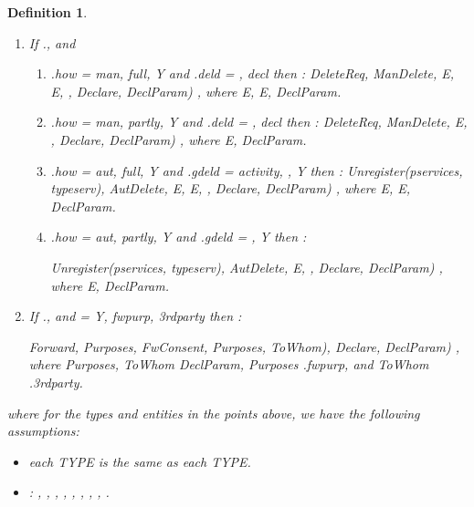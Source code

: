 \documentclass[a4paper]{article}
\newtheorem{ttd}{Definition}
\begin{document}
\begin{ttd}
\begin{enumerate}
\begin{enumerate}
\item .\textit{storerev} = t1, t2 , \textit{places}, Y then , ,   \textit{PartOf}(), OWNER() =  and \textit{Storerev}(, , \textit{TT}), \textit{Declare}, \textit{DeclParam})  , where   \textit{DeclParam}, and  = \textit{places} and t1  \textit{TT}  t2.  
\end{enumerate}

\item If  ., and 
\begin{enumerate}
\item .\textit{how} = \textit{man}, \textit{full}, Y and .\textit{deld} = , \textit{decl} then 
 : \textit{DeleteReq}, \textit{ManDelete}, E, E, ,  \textit{Declare}, \textit{DeclParam})  , where E, E,   \textit{DeclParam}. 

\item .\textit{how} = \textit{man}, \textit{partly}, Y and .\textit{deld} = , \textit{decl} then 
 : \textit{DeleteReq}, \textit{ManDelete}, E, , \textit{Declare}, \textit{DeclParam})  , where  E,   \textit{DeclParam}.  



\item .\textit{how} = \textit{aut}, \textit{full}, Y and .\textit{gdeld} = \textit{activity}, , Y then  :
\textit{Unregister}(\textit{pservices}, \textit{typeserv}), \textit{AutDelete}, E, E, , \textit{Declare}, \textit{DeclParam})  , where E, E,   \textit{DeclParam}.

\item .\textit{how} = \textit{aut}, \textit{partly}, Y and .\textit{gdeld} = , Y then  : 

\textit{Unregister}(\textit{pservices}, \textit{typeserv}), \textit{AutDelete}, E, , \textit{Declare}, \textit{DeclParam})  , where E,   \textit{DeclParam}.
\end{enumerate}

\item If  ., and  
 = Y, \textit{fwpurp}, \textit{3rdparty} then : 

\textit{Forward}, \textit{Purposes},  \textit{FwConsent}, \textit{Purposes}, \textit{ToWhom}), \textit{Declare},  \textit{DeclParam})  , where \textit{Purposes}, \textit{ToWhom}  \textit{DeclParam},  \textit{Purposes}   .\textit{fwpurp}, and \textit{ToWhom}  .\textit{3rdparty}.     
\end{enumerate}

\noindent where  for the types and entities in the points above, we have the following assumptions:

\begin{itemize}
\item each   \textit{TYPE} is the same as each   \textit{TYPE}. 

\item   :   ,   ,   ,   ,   ,   ,    ,   ,    .
\end{itemize}

\end{ttd}
\end{document}
